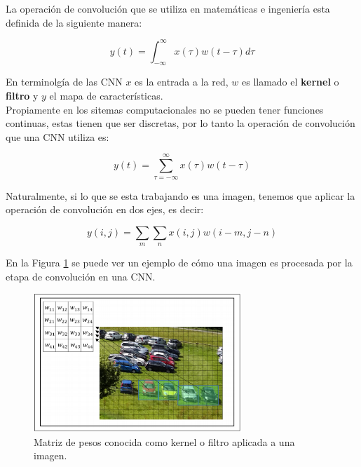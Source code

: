     La operación de convolución que se utiliza en matemáticas e ingeniería esta definida de la siguiente manera:
    
    \begin{equation}
    	y(t) = \int_{-\infty}^{\infty} x(\tau)w(t-\tau)d\tau
    \end{equation}
    
    En terminolgía de las CNN $x$ es la entrada a la red, $w$ es llamado el \textbf{kernel} o \textbf{filtro} y $y$ el mapa de características. \\
    
    Propiamente en los sitemas computacionales no se pueden tener funciones continuas, estas tienen que ser discretas, por lo tanto la operación de convolución que una CNN utiliza es:
    
    \begin{equation}
    	y(t) = \sum_{\tau = -\infty}^{\infty} x(\tau)w(t-\tau)
    \end{equation}
    
    Naturalmente, si lo que se esta trabajando es una imagen, tenemos que aplicar la operación de convolución en dos ejes, es decir:
    
    \begin{equation}
    	y(i,j) = \sum_{m}\sum_{n} x(i,j)w(i-m, j-n)
    \end{equation}
    
    En la Figura \ref{fig:CNNFilter} se puede ver un ejemplo de cómo una imagen es procesada por la etapa de convolución en una CNN.
    
    \begin{figure}[H]
    	\centering
    	\includegraphics[width=0.7\textwidth]{capitulo2/images/CNN_window.png}
    	\caption{Matriz de pesos conocida como kernel o filtro aplicada a una imagen.}
    	\label{fig:CNNFilter}
    \end{figure}
    

